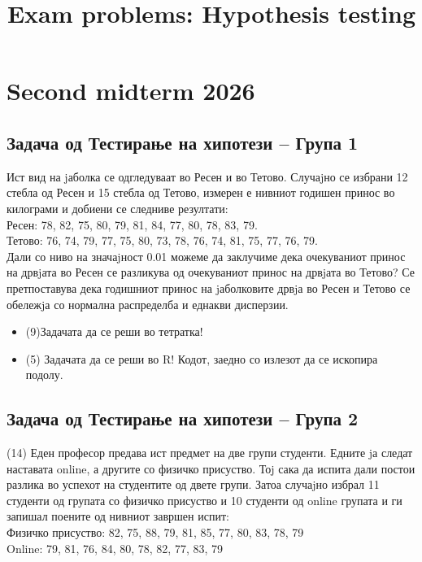 \documentclass[a4paper, 12pt]{article}
\title{
  \vspace{-1.5cm}
  \textbf{Exam problems: Hypothesis testing}
  \vspace{-1.5cm}
}
\date{}
\begin{document}
\maketitle

\section{Second midterm 2026}
\subsection*{Задача од Тестирање на хипотези – Група 1}

Ист вид на jаболка се одгледуваат во Ресен и во Тетово. Случаjно се избрани 12 стебла од Ресен и 15 стебла од Тетово, измерен е нивниот годишен принос во килограми и добиени се следниве резултати:\\


Ресен: 78, 82, 75, 80, 79, 81, 84, 77, 80, 78, 83, 79.\\
Тетово: 76, 74, 79, 77, 75, 80, 73, 78, 76, 74, 81, 75, 77, 76, 79. \\ 

Дали со ниво на значаjност 0.01 можеме да заклучиме дека очекуваниот принос на дрвjата во Ресен се разликува од очекуваниот принос на дрвjата во Тетово? Се претпоставува дека годишниот принос на jаболковите дрвjа во Ресен и Тетово се обележjа со нормална распределба и еднакви дисперзии.

\begin{itemize}
  \item [а)] (9)Задачата да се реши во тетратка!
  \item [б)] (5) Задачата да се реши во R! Кодот, заедно со излезот да се ископира подолу.
\end{itemize}

\subsection*{Задача од Тестирање на хипотези – Група 2}

(14) Еден професор предава ист предмет на две групи студенти. Едните jа следат наставата online, а другите со физичко присуство. Тоj сака да испита дали постои разлика во успехот на студентите од двете групи. Затоа случаjно избрал 11 студенти од групата со физичко присуство и 10 студенти од online групата и ги запишал поените од нивниот завршен испит:\\

Физичко присуство: 82, 75, 88, 79, 81, 85, 77, 80, 83, 78, 79\\
Online: 79, 81, 76, 84, 80, 78, 82, 77, 83, 79\\
\end{document}
